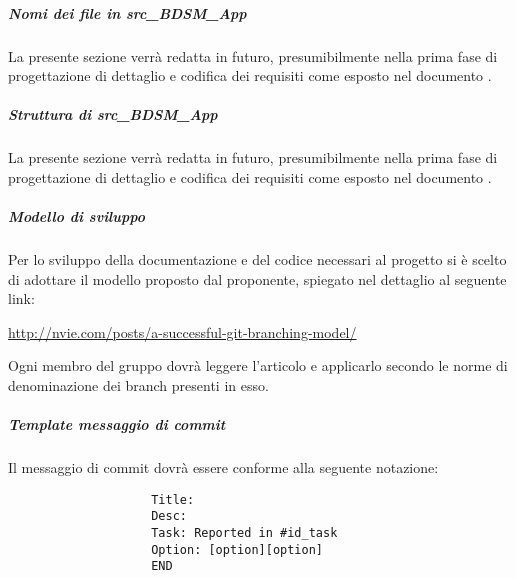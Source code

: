 				\subparagraph{Nomi dei file in src\_BDSM\_App}
				La presente sezione verrà redatta in futuro, presumibilmente nella prima fase di progettazione di dettaglio e codifica dei requisiti come esposto nel documento \docNameVersionPdP.
				\subparagraph{Struttura di src\_BDSM\_App}
				La presente sezione verrà redatta in futuro, presumibilmente nella prima fase di progettazione di dettaglio e codifica dei requisiti come esposto nel documento \docNameVersionPdP.

				\subparagraph{Modello di sviluppo}
				Per lo sviluppo della documentazione e del codice necessari al progetto si è scelto di adottare il modello proposto dal proponente, spiegato nel dettaglio al seguente link:
					\begin{center}
						\url{http://nvie.com/posts/a-successful-git-branching-model/}
					\end{center}
					Ogni membro del gruppo dovrà leggere l'articolo e applicarlo secondo le norme di denominazione dei branch presenti in esso.

				\subparagraph{Template messaggio di commit} \label{sec:messaggio_di_commit}
				Il messaggio di commit dovrà essere conforme alla seguente notazione:
				\begin{verbatim}
					Title:
					Desc:
					Task: Reported in #id_task
					Option: [option][option]
					END
				\end{verbatim}
				
				
